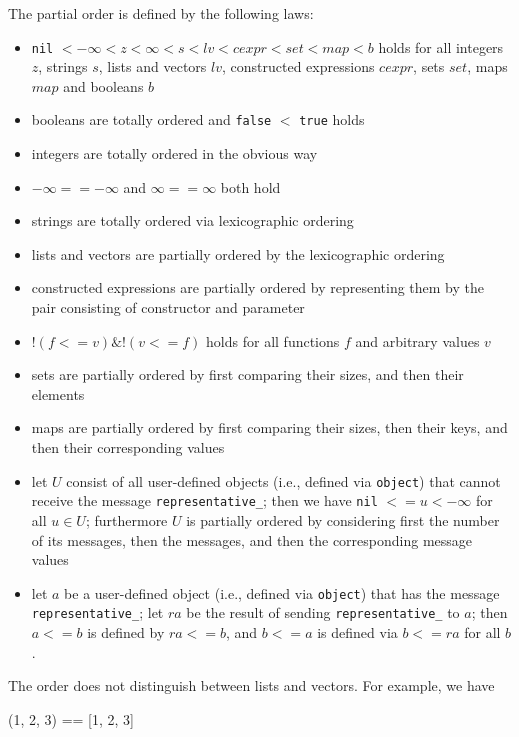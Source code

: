 \documentclass[11pt]{amsart}
\newcommand{\babelsrc}[1] {\lstinline!#1!}
\begin{document}
The partial order is defined by the following laws:
\begin{itemize}
\item  \babelsrc{nil} $< -\infty <  z  < \infty < s <  lv < cexpr < set < map < b$ holds for all
 integers $z$, strings $s$,  lists and vectors $lv$,  constructed expressions $cexpr$, sets $set$, maps $map$ and booleans $b$
 \item booleans are totally ordered and \babelsrc{false} $<$ \babelsrc{true} holds
 \item integers are totally ordered in the obvious way
 \item $-\infty == -\infty$ and $\infty == \infty$ both hold 
 \item strings are totally ordered via lexicographic ordering
\item lists and vectors are partially ordered by the lexicographic ordering 
\item constructed expressions are partially ordered by representing them by the pair consisting of constructor and parameter
\item $! (f <= v) \& ! (v <= f)$ holds for all functions $f$ and arbitrary values $v$
\item sets are partially ordered by first comparing their sizes, and then their elements 
\item maps are partially ordered by first comparing their sizes, then their keys, and then their corresponding values
\item let $U$ consist of all user-defined objects  (i.e., defined via \babelsrc{object}) that cannot receive the message \texttt{representative\_}; then we have  \babelsrc{nil} $<= u < -\infty$  for all $u \in U$; furthermore $U$ is partially ordered by considering first the number of its messages, then the messages, and then the corresponding message values
\item let $a$ be a user-defined object  (i.e., defined via \babelsrc{object}) that has the message \texttt{representative\_}; let $ra$ be the result of sending  \texttt{representative\_} to $a$; then $a <= b$ is defined by $ra <= b$, and $b <= a$ is defined via $b <= ra$ for all $b$.
\end{itemize}
The order does not distinguish between lists and vectors. For example, we have 
\begin{babellisting}
(1, 2, 3) == [1, 2, 3]
\end{babellisting}
\end{document}
